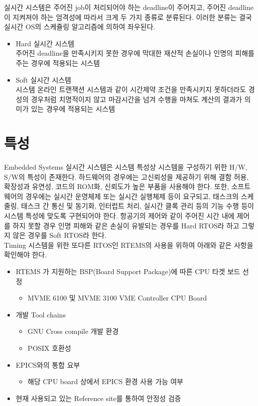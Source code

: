 \documentclass[11pt
  , a4paper
  , article
  , oneside
]{memoir}
\begin{document}
실시간 시스템은 주어진 job이 처리되어야 하는 deadline이 주어지고, 주어진 deadline이 지켜져야 하는 엄격성에 따라서 크게 두 가지 종류로 분류된다. 이러한 분류는 결국 실시간 OS의 스케쥴링 알고리즘에 의하여 좌우된다.

\begin{itemize}
	\item Hard 실시간 시스템 \\
	주어진 deadline을 만족시키지 못한 경우에 막대한 재산적 손실이나 인명의 피해를 주는 경우에 적용되는 시스템
	\item Soft 실시간 시스템 \\
	시스템 온라인 트랜잭션 시스템과 같이 시간제약 조건을 만족시키지	못하더라도 경성의 경우처럼 치명적이지 않고 마감시간을 넘겨 수행을 마쳐도 계산의 결과가 의미가 있는 경우에 적용되는 시스템
\end{itemize}

\section{특성}

Embedded Systems 실시간 시스템은 시스템 특성상 시스템을 구성하기 위한 H/W, S/W의 특성이 존재한다. 하드웨어의 경우에는 고신뢰성을 제공하기 위해 결함 허용, 확장성과 유연성, 코드의 ROM화, 신뢰도가 높은 부품을 사용해야 한다. 또한, 소프트웨어의 경우에는 실시간 운영체제 또는 실시간 실행체제 등이 요구되고, 태스크의 스케줄링, 태스크 간 통신 및 동기화, 인터럽트 처리, 실시간 클록 관리 등의 기능 수행 등이 시스템 특성에 맞도록 구현되어야 한다. 항공기의 제어와 같이 주어진 시간 내에 제어를 하지 못할 경우 인명 피해와 같은 손실이 유발되는 경우를 Hard RTOS라 하고 그렇지 않은 경우를 Soft RTOS라 한다. \\

Timing 시스템을 위한 또다른 RTOS인 RTEMS의 사용을 위하여 아래와 같은 사항을 확인해야 한다.

\begin{itemize}
	\item RTEMS 가 지원하는 BSP(Board Support Package)에 따른 CPU 타겟 보드 선정
	\begin{itemize}
		\item MVME 6100 및 MVME 3100 VME Controller CPU Board
	\end{itemize}
	\item 개발 Tool chains
	\begin{itemize}
		\item GNU Cross compile 개발 환경
		\item POSIX 호환성
	\end{itemize}
	\item EPICS와의 통합 요부
	\begin{itemize}
		\item 해당 CPU board 상에서 EPICS 환경 사용 가능 여부 
	\end{itemize}
	\item 현재 사용되고 있는 Reference site를 통하여 안정성 검증
\end{itemize}
\end{document}
